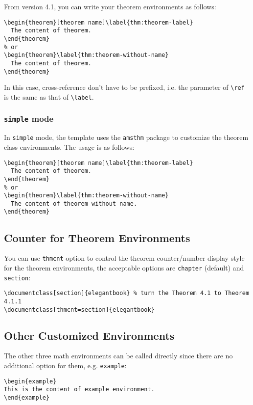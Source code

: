 \documentclass[11pt]{elegantbook}
\begin{document}
From version 4.1, you can write your theorem environments as follows:
\begin{lstlisting}
\begin{theorem}[theorem name]\label{thm:theorem-label}
  The content of theorem.
\end{theorem}
% or
\begin{theorem}\label{thm:theorem-without-name}
  The content of theorem.
\end{theorem}
\end{lstlisting}

In this case, cross-reference don't have to be prefixed, i.e. the parameter of \lstinline{\ref} is the same as that of \lstinline{\label}.
 
\subsubsection{\lstinline{simple} mode}

In \lstinline{simple} mode, the template uses the \lstinline{amsthm} package to customize the theorem class environments. The usage is as follows:

\begin{lstlisting}
\begin{theorem}[theorem name]\label{thm:theorem-label}
  The content of theorem.
\end{theorem}
% or 
\begin{theorem}\label{thm:theorem-without-name}
  The content of theorem without name.
\end{theorem}
\end{lstlisting}

\subsection{Counter for Theorem Environments}

You can use \lstinline{thmcnt} option to control the theorem counter/number display style for the theorem environments, the acceptable options are \lstinline{chapter} (default) and \lstinline{section}:

\begin{lstlisting}
\documentclass[section]{elegantbook} % turn the Theorem 4.1 to Theorem 4.1.1 
\documentclass[thmcnt=section]{elegantbook}
\end{lstlisting}


\subsection{Other Customized Environments}
The other three math environments can be called directly since there are no additional option for them, e.g. \lstinline{example}:
\begin{lstlisting}
\begin{example}
This is the content of example environment.
\end{example}
\end{lstlisting}
\end{document}
